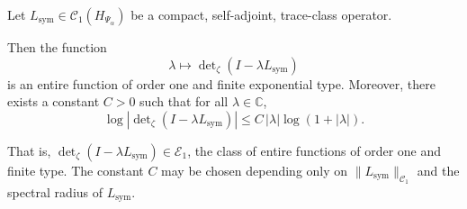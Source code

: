 \begin{lemma}
\label{lem:det_growth_bound}
Let \( L_{\mathrm{sym}} \in \mathcal{C}_1(H_{\Psi_\alpha}) \) be a compact, self-adjoint, trace-class operator.

Then the function
\[
\lambda \mapsto \det\nolimits_{\zeta}(I - \lambda L_{\mathrm{sym}})
\]
is an entire function of order one and finite exponential type. Moreover, there exists a constant \( C > 0 \) such that for all \( \lambda \in \mathbb{C} \),
\[
\log \left| \det\nolimits_{\zeta}(I - \lambda L_{\mathrm{sym}}) \right|
\le C\, |\lambda| \log(1 + |\lambda|).
\]

\medskip
\noindent
That is, \( \det_\zeta(I - \lambda L_{\mathrm{sym}}) \in \mathcal{E}_1 \), the class of entire functions of order one and finite type. The constant \( C \) may be chosen depending only on \( \|L_{\mathrm{sym}}\|_{\mathcal{C}_1} \) and the spectral radius of \( L_{\mathrm{sym}} \).
\end{lemma}
%  